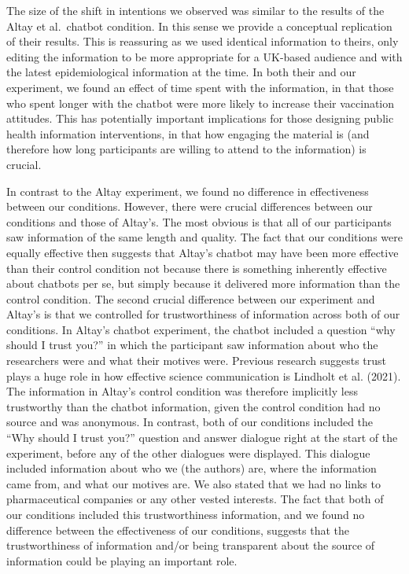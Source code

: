 \documentclass[
  english,
  ,jou,floatsintext]{apa6}
\begin{document}
The size of the shift in intentions we observed was similar to the results of the Altay et al.~chatbot condition. In this sense we provide a conceptual replication of their results. This is reassuring as we used identical information to theirs, only editing the information to be more appropriate for a UK-based audience and with the latest epidemiological information at the time. In both their and our experiment, we found an effect of time spent with the information, in that those who spent longer with the chatbot were more likely to increase their vaccination attitudes. This has potentially important implications for those designing public health information interventions, in that how engaging the material is (and therefore how long participants are willing to attend to the information) is crucial.

In contrast to the Altay experiment, we found no difference in effectiveness between our conditions. However, there were crucial differences between our conditions and those of Altay's. The most obvious is that all of our participants saw information of the same length and quality. The fact that our conditions were equally effective then suggests that Altay's chatbot may have been more effective than their control condition not because there is something inherently effective about chatbots per se, but simply because it delivered more information than the control condition. The second crucial difference between our experiment and Altay's is that we controlled for trustworthiness of information across both of our conditions. In Altay's chatbot experiment, the chatbot included a question ``why should I trust you?'' in which the participant saw information about who the researchers were and what their motives were. Previous research suggests trust plays a huge role in how effective science communication is Lindholt et al. (2021). The information in Altay's control condition was therefore implicitly less trustworthy than the chatbot information, given the control condition had no source and was anonymous. In contrast, both of our conditions included the ``Why should I trust you?'' question and answer dialogue right at the start of the experiment, before any of the other dialogues were displayed. This dialogue included information about who we (the authors) are, where the information came from, and what our motives are. We also stated that we had no links to pharmaceutical companies or any other vested interests. The fact that both of our conditions included this trustworthiness information, and we found no difference between the effectiveness of our conditions, suggests that the trustworthiness of information and/or being transparent about the source of information could be playing an important role.
\end{document}
